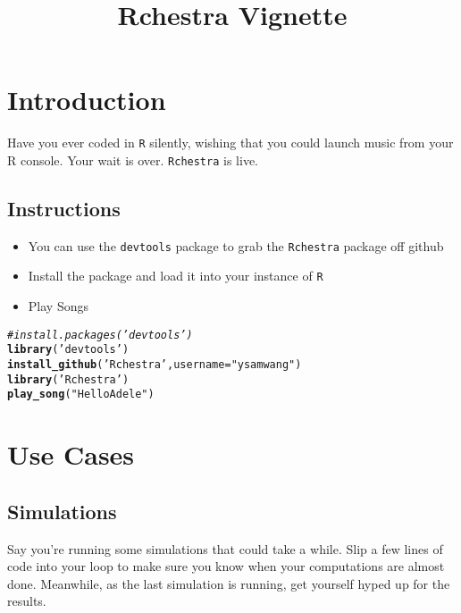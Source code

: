 \documentclass{article}\usepackage[]{graphicx}\usepackage[]{color}
\title{Rchestra Vignette}
\makeatletter
\newcommand{\hlstr}[1]{\textcolor[rgb]{0.192,0.494,0.8}{#1}}%
\newcommand{\hlcom}[1]{\textcolor[rgb]{0.678,0.584,0.686}{\textit{#1}}}%
\newcommand{\hlstd}[1]{\textcolor[rgb]{0.345,0.345,0.345}{#1}}%
\newcommand{\hlkwc}[1]{\textcolor[rgb]{0.333,0.667,0.333}{#1}}%
\newcommand{\hlkwd}[1]{\textcolor[rgb]{0.737,0.353,0.396}{\textbf{#1}}}%
\newenvironment{kframe}{%
 \def\at@end@of@kframe{}%
 \ifinner\ifhmode%
  \def\at@end@of@kframe{\end{minipage}}%
  \begin{minipage}{\columnwidth}%
 \fi\fi%
 \def\FrameCommand##1{\hskip\@totalleftmargin \hskip-\fboxsep
 \colorbox{shadecolor}{##1}\hskip-\fboxsep
     \hskip-\linewidth \hskip-\@totalleftmargin \hskip\columnwidth}%
 \MakeFramed {\advance\hsize-\width
   \@totalleftmargin\z@ \linewidth\hsize
   \@setminipage}}%
 {\par\unskip\endMakeFramed%
 \at@end@of@kframe}
\newenvironment{knitrout}{}{} %
\makeatother
\begin{document}
\maketitle
\section{Introduction}
Have you ever coded in \texttt{R} silently, wishing that you could launch music from your R console. Your wait is over. \texttt{Rchestra} is live.

\subsection{Instructions}
\begin{itemize}
\item You can use the \texttt{devtools} package to grab the \texttt{Rchestra} package off github
\item Install the package and load it into your instance of \texttt{R}
\item Play Songs
\end{itemize}
\begin{knitrout}
\color{fgcolor}\begin{kframe}
\begin{alltt}
\hlcom{# install.packages('devtools')}
\hlkwd{library}\hlstd{(}\hlstr{'devtools'}\hlstd{)}
\hlkwd{install_github}\hlstd{(}\hlstr{'Rchestra'}\hlstd{,} \hlkwc{username} \hlstd{=} \hlstr{"ysamwang"}\hlstd{)}
\hlkwd{library}\hlstd{(}\hlstr{'Rchestra'}\hlstd{)}
\hlkwd{play_song}\hlstd{(}\hlstr{"Hello Adele"}\hlstd{)}
\end{alltt}
\end{kframe}
\end{knitrout}

\section{Use Cases}

\subsection{Simulations}
Say you're running some simulations that could take a while. Slip a few lines of code into your loop to make sure you know when your computations are almost done. Meanwhile, as the last simulation is running, get yourself hyped up for the results.
\end{document}
